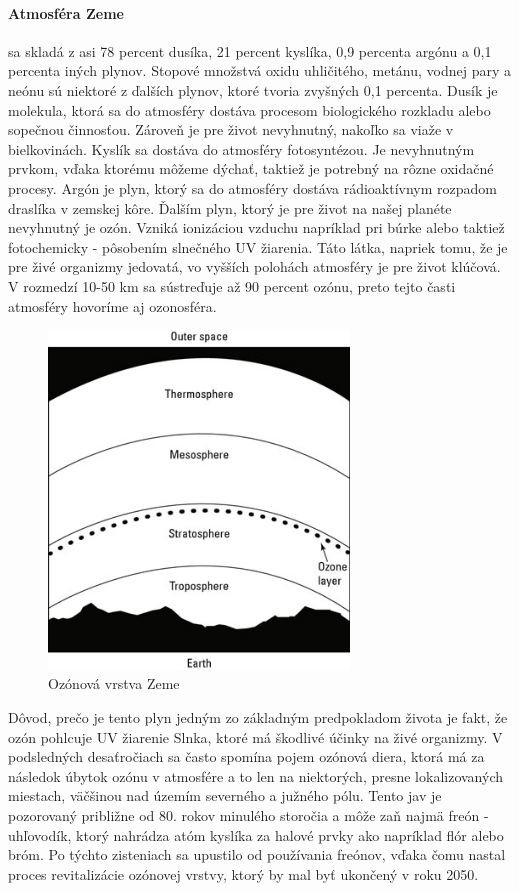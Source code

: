 \paragraph{Atmosféra Zeme} sa skladá z asi 78 percent dusíka, 21 percent kyslíka, 0,9 percenta argónu a 0,1 percenta iných plynov. Stopové množstvá oxidu uhličitého, metánu, vodnej pary a neónu sú niektoré z ďalších plynov, ktoré tvoria zvyšných 0,1 percenta. Dusík je molekula, ktorá sa do atmosféry dostáva procesom biologického rozkladu alebo sopečnou činnosťou. Zároveň je pre život nevyhnutný, nakoľko sa viaže v bielkovinách. Kyslík sa dostáva do atmosféry fotosyntézou. Je nevyhnutným prvkom, vďaka ktorému môžeme dýchať, taktiež je potrebný na rôzne oxidačné procesy. Argón je plyn, ktorý sa do atmosféry dostáva rádioaktívnym rozpadom draslíka v zemskej kôre. 
Ďalším plyn, ktorý je pre život na našej planéte nevyhnutný je ozón. Vzniká ionizáciou vzduchu napríklad pri búrke alebo taktiež fotochemicky - pôsobením slnečného UV žiarenia. Táto látka, napriek tomu, že je pre živé organizmy jedovatá, vo vyšších polohách atmosféry je pre život klúčová. V rozmedzí 10-50 km sa sústreďuje až 90 percent ozónu, preto tejto časti atmosféry hovoríme aj ozonosféra. 
\begin{figure}[!htbp]
  \centering
  \includegraphics[width=8cm]{img/ozone.jpg}
  \caption{Ozónová vrstva Zeme}
  \label{numModel}
\end{figure}
\newline Dôvod, prečo je tento plyn jedným zo základným predpokladom života je fakt, že ozón pohlcuje UV žiarenie Slnka, ktoré má škodlivé účinky na živé organizmy. V podsledných desaťročiach sa často spomína pojem ozónová diera, ktorá má za následok úbytok ozónu v atmosfére a to len na niektorých, presne lokalizovaných miestach, väčšinou nad územím severného a južného pólu. Tento jav je pozorovaný približne od 80. rokov minulého storočia a môže zaň najmä freón - uhľovodík, ktorý nahrádza atóm kyslíka za halové prvky ako napríklad flór alebo bróm. Po týchto zisteniach sa upustilo od používania freónov, vďaka čomu nastal proces revitalizácie ozónovej vrstvy, ktorý by mal byť ukončený v roku 2050.

